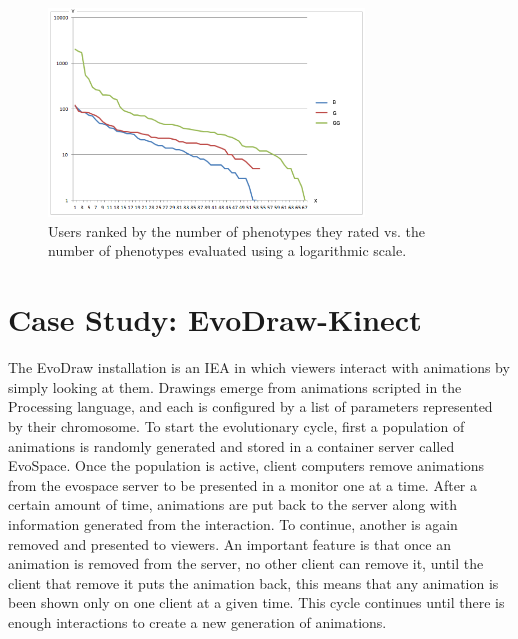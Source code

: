 \begin{figure}[!t]
    \centering
        \includegraphics[width=3.3in]{img/comparison.png}
    \caption{Users ranked by the number of phenotypes they rated vs. the number of phenotypes evaluated using a logarithmic scale. }
    \label{fig:top-ranked-participation}
\end{figure}

\section{Case Study: EvoDraw-Kinect}
The EvoDraw installation is an IEA in which viewers interact with animations by simply
looking at them. Drawings emerge from animations scripted in the Processing 
language, and each is configured by a list of parameters represented by their
chromosome. To start the evolutionary cycle, first a population of animations is 
randomly generated and stored in a container server called EvoSpace. 
Once the population is active,  client computers remove animations from the evospace 
server to be presented in a monitor one at a time. After a certain amount of time, 
animations are put back to the server along with information generated from the interaction.
To continue, another is again removed and presented to viewers. An important feature 
is that once an animation is removed from the server, no other client can remove it, 
until the client that remove it puts the animation back, this means that any
animation is been shown only on one client at a given time. This cycle continues until there
is enough interactions to create a new generation of animations. 

